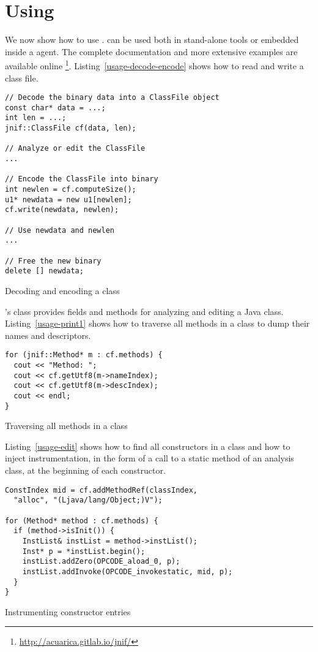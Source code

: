 \section{Using \jnif{}}\label{sec:jnif-usage}

We now show how to use \jnif{}.
\jnif{} can be used both in stand-alone tools or
embedded inside a \jvmti{} agent.
The complete \api{} documentation and more extensive examples are available online%
\footnote{\url{http://acuarica.gitlab.io/jnif/}}.
Listing~\ref{usage-decode-encode} shows how to read and write a class file.

\begin{listing}
\begin{verbatim}
// Decode the binary data into a ClassFile object
const char* data = ...;
int len = ...;
jnif::ClassFile cf(data, len);

// Analyze or edit the ClassFile
...

// Encode the ClassFile into binary
int newlen = cf.computeSize();
u1* newdata = new u1[newlen];
cf.write(newdata, newlen);

// Use newdata and newlen
...

// Free the new binary
delete [] newdata;
\end{verbatim}
\caption{Decoding and encoding a class}
\label{usage-decode-encode}
\end{listing}

\jnif{}'s  class provides fields and methods for analyzing and editing a Java class.
Listing~\ref{usage-print1} shows how to traverse all methods in a class
to dump their names and descriptors.

\begin{listing}
\begin{verbatim}
for (jnif::Method* m : cf.methods) {
  cout << "Method: ";
  cout << cf.getUtf8(m->nameIndex);
  cout << cf.getUtf8(m->descIndex);
  cout << endl;
}
\end{verbatim}
\caption{Traversing all methods in a class}
\label{usage-print1}
\end{listing}

Listing~\ref{usage-edit} shows how to find all constructors in a class
and how to inject instrumentation, in the form of a call to a static method
 of an analysis class,
at the beginning of each constructor.

\begin{listing}
\begin{verbatim}
ConstIndex mid = cf.addMethodRef(classIndex, 
  "alloc", "(Ljava/lang/Object;)V");

for (Method* method : cf.methods) {
  if (method->isInit()) {
    InstList& instList = method->instList();
    Inst* p = *instList.begin();
    instList.addZero(OPCODE_aload_0, p);
    instList.addInvoke(OPCODE_invokestatic, mid, p);
  }
}
\end{verbatim}
\caption{Instrumenting constructor entries}
\label{usage-edit}
\end{listing}

